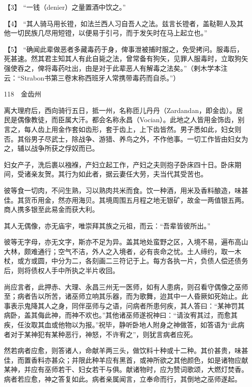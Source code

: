 \documentclass[12pt,UTF8]{ctexbook}
\begin{document}
【3】 “一钱（denier）之量置酒中饮之。”

【4】 “其人骑马用长镫，如法兰西人习自吾人之法。兹言长镫者，盖鞑靼人及其他一切民族几尽用短镫，以便易于引弓，而于发矢时在马上起立也。”

【5】 “确闻此辈做恶者多藏毒药于身，俾事泄被捕时服之，免受拷问。服毒后，死甚速。然其君主知其人有此自毙之法，曾常备有狗矢，见罪人服毒时，立取狗矢强使吞之，俾将毒药吐出，由是对于此辈恶人有解毒之法矣。”（剌木学本注云：“Strabon书第三卷末称西班牙人常携带毒药而自杀。”）





118　金齿州

离大理府后，西向骑行五日，抵一州，名称匝儿丹丹（Zardandan，即金齿）。居民是偶像教徒，而臣属大汗。都会名称永昌（Vocian）。此地之人皆用金饰齿，别言之，每人齿上用金作套如齿形，套于齿上，上下齿皆然。男子悉如此，妇女则否。其俗男子尽武士，除战争、游猎、养鸟之外，不作他事。一切工作皆由妇女为之，辅以战争所获之俘奴而已。

妇女产子，洗后裹以襁褓，产妇立起工作，产妇之夫则抱子卧床四十日。卧床期间，受诸亲友贺。其行为如此者，据云妻任大劳，夫当代其受苦也。

彼等食一切肉，不问生熟，习以熟肉共米而食。饮一种酒，用米及香料酿造，味甚佳。其货币用金，然亦用海贝。其境周围五月程之地无银矿，故金一两值银五两。商人携多银至此易金而获大利。

其人无偶像，亦无庙宇，唯崇拜其族之元祖，而云：“吾辈皆彼所出。”

彼等无字母，亦无文字，斯亦不足为异。盖其地处蛮野之区，入境不易，遍布高山大林，颇难通行；空气不洁，外人之入境者，必有丧命之忧。土人缔约，取一木杖，或方或圆，中分为二，各刻画二三符记于上。每方各执一片，负债人偿还债务后，则将债权人手中所执之半片收回。

尚应言者，此押赤、大理、永昌三州无一医师，如有人患病，则召看守偶像之巫师至；病者告以所苦，诸巫师立响其乐器，而为歌舞，迨其中一人昏厥如死始止。此事表示鬼降其人之身，同伴巫师与之语，问病者所患何疾，其人答曰：“某神罚其病卧，盖其侮此神，而神不欢也。”其他诸巫师遂祝神曰：“请汝宥其过，而愈其疾，任汝取其血或他物以为报。”祝毕，静听卧地人附身之神做答，如答语为“此病者对于某神犯有某种恶行，神怒，不许宥之”，则犹言病者应死。

然若病者应愈，则答诸人，命献羊两三头，做饮料十种或十二种。其价甚贵，味甚佳，而置香料亦甚众；并限此种羊应有黑首，或神所欲之其他颜色，如是诸物应献某神，并应有巫师若干、妇女若干与俱。献诸物时，应为赞词歌颂，大燃灯焚香。病者若应愈，神之答复如此。病者亲属闻言，立奉命而行，其倒地之巫师遂起。
\end{document}
